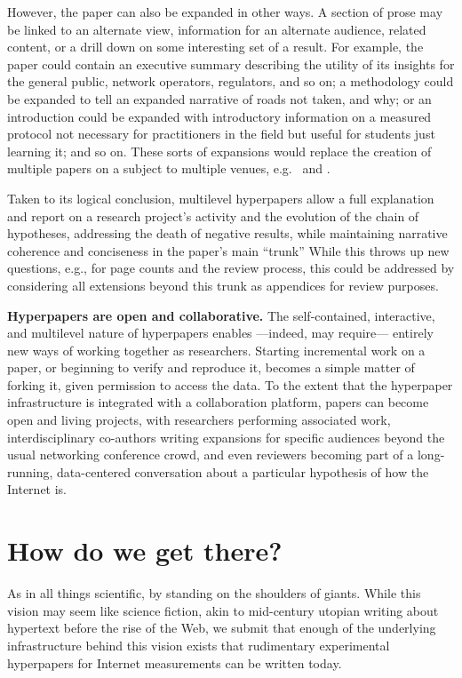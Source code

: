 \documentclass[sigconf]{acmart}
\begin{document}
However, the paper can also be expanded in other ways. A section of prose may be
linked to an alternate view, information for an alternate audience, related
content, or a drill down on some interesting set of a result. For example, the
paper could contain an executive summary describing the utility of its insights
for the general public, network operators, regulators, and so on; a methodology
could be expanded to tell an expanded narrative of roads not taken, and why; or
an introduction could be expanded with introductory information on a measured
protocol not necessary for practitioners in the field but useful for students
just learning it; and so on.  These sorts of expansions would replace the
creation of multiple papers on a subject to multiple venues,
e.g.~\cite{Dhamdhere18} and \cite{Clark18}.

Taken to its logical conclusion, multilevel hyperpapers allow a full explanation
and report on a research project's activity and the evolution of the chain of
hypotheses, addressing the death of negative results, while maintaining
narrative coherence and conciseness in the paper's main ``trunk'' While this
throws up new questions, e.g., for page counts and the review process, this
could be addressed by considering all extensions beyond this trunk as appendices
for review purposes.

\textbf{Hyperpapers are open and collaborative.}  The self-contained,
interactive, and multilevel nature of hyperpapers enables ---indeed, may
require--- entirely new ways of working together as researchers. Starting
incremental work on a paper, or beginning to verify and reproduce it, becomes a
simple matter of forking it, given permission to access the data. To the extent
that the hyperpaper infrastructure is integrated with a collaboration platform,
papers can become open and living projects, with researchers performing
associated work, interdisciplinary co-authors writing expansions for specific
audiences beyond the usual networking conference crowd, and even reviewers
becoming part of a long-running, data-centered conversation about a particular
hypothesis of how the Internet is.

\section{How do we get there?}
\label{sec:how}

As in all things scientific, by standing on the shoulders of giants. While this
vision may seem like science fiction, akin to mid-century utopian writing about
hypertext before the rise of the Web, we submit that enough of the underlying
infrastructure behind this vision exists that rudimentary experimental
hyperpapers for Internet measurements can be written today.
\end{document}
